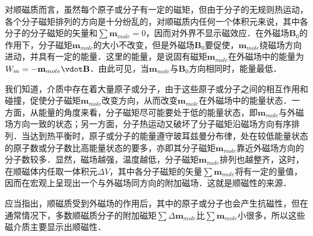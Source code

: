 
对顺磁质而言，虽然每个原子或分子有一定的磁矩，但由于分子的无规则热运动，各个分子磁矩排列的方向是十分纷乱的，对顺磁质内任何一个体积元来说，其中各分子的分子磁矩的矢量和$\sum \mathbf{m}_{mole}=0$，因而对外界不显示磁效应．在外磁场$\mathbf B_0$的作用下，分子磁矩$\mathbf{m}_{mole}$的大小不改变，但是外磁场$\mathbf B_0$要促使，$\mathbf{m}_{mole}$绕磁场方向进动，并具有一定的能量．这里的能量，是说固有磁矩$\mathbf m_{mole}$在外磁场中的能量为$W_m=-\mathbf m_{mole} \vdot \mathbf B$．由此可见，当$\mathbf m_{mole}$与$\mathbf B_0$方向相同时，能量最低．

我们知道，介质中存在着大量原子或分子，由于这些原子或分子之间的相互作用和碰撞，促使分子磁矩$\mathbf m_{mole}$改变方向，从而改变$\mathbf m_{mole}$在外磁场中的能量状态．一方面，从能量的角度来看，分子磁矩尽可能要处于低的能量状态，即$\mathbf m_{mole}$与外磁场方向一致的状态；另一方面，分子热运动又破坏了分子磁矩沿磁场方向有序排列．当达到热平衡时，原子或分子的能量遵守玻耳兹曼分布律，处在较低能量状态的原子数或分子数比高能量状态的要多，亦即其分子磁矩$\mathbf m_{mole}$靠近外磁场方向的分子数较多．显然，磁场越强，温度越低，分子磁矩$\mathbf m_{mole}$排列也越整齐，这时，在顺磁体内任取一体积元$\Delta V$，其中各分子磁矩的矢量$\sum \mathbf m_{mole}$将有一定的量值，因而在宏观上呈现出一个与外磁场同方向的附加磁场．这就是顺磁性的来源．

应当指出，顺磁质受到外磁场的作用后，其中的原子或分子也会产生抗磁性，但在通常情况下，多数顺磁质分子的附加磁矩$\sum \Delta\mathbf m_{mole}$比$\sum \mathbf m_{mole}$小很多，所以这些磁介质主要显示出顺磁性．